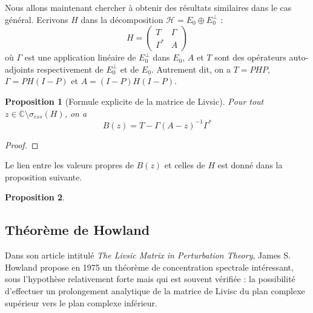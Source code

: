\documentclass[12pt,openany,a4paper, titlepage]{article}
\newcommand{\C}{\mathbb{C}}
\newcommand{\HH}{\mathcal{H}}
\newtheorem{prop}{Proposition}
\theoremstyle{definition}
\theoremstyle{definition}
\theoremstyle{definition}
\theoremstyle{definition}
\theoremstyle{definition}
\theoremstyle{definition}
\begin{document}
Nous allons maintenant chercher à obtenir des résultats similaires dans le cas général. Ecrivons $H$ dans la décomposition $\HH = E_0 \oplus E_0^\perp$ :
\begin{equation}
    H = \begin{pmatrix}
        T & \Gamma \\
        \Gamma^* & A 
\end{pmatrix}
\end{equation}
où $\Gamma$ est une application linéaire de $E_0^\perp$ dans $E_0$, $A$ et $T$ sont des opérateurs auto-adjoints respectivement de $E_0^\perp$ et de $E_0$. Autrement dit, on a $T = PHP$, $\Gamma = PH(I-P)$ et $A = (I-P)H(I-P)$.

\begin{prop}[Formule explicite de la matrice de Livsic]
Pour tout $z\in\C\setminus\sigma_{ess}(H)$, on a 
\begin{equation}
    B(z) = T - \Gamma(A -z)^{-1}\Gamma^*
\end{equation}
\end{prop}

\begin{proof}
    
\end{proof}

Le lien entre les valeurs propres de $B(z)$ et celles de $H$ est donné dans la proposition suivante.

\begin{prop}
    
\end{prop}

\subsection{Théorème de Howland}

Dans son article intitulé \textit{The Livsic  Matrix in Perturbation Theory}, James S. Howland propose en 1975 un théorème de concentration spectrale intéressant, sous l'hypothèse relativement forte mais qui est souvent vérifiée : la possibilité d'effectuer un prolongement analytique de la matrice de Livisc du plan complexe supérieur vers le plan complexe inférieur.
\end{document}
